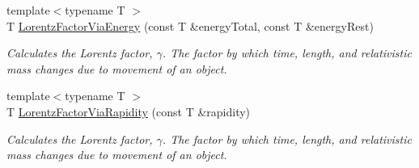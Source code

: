 \begin{DoxyCompactItemize}
{\footnotesize template$<$typename T $>$ }\\T \hyperlink{group___relativity_ga601de8c039be89a9abea22bc459436c9}{Lorentz\+Factor\+Via\+Energy} (const T \&energy\+Total, const T \&energy\+Rest)
\begin{DoxyCompactList}\small\item\em Calculates the Lorentz factor, $\gamma$. The factor by which time, length, and relativistic mass changes due to movement of an object. \end{DoxyCompactList}\item 
{\footnotesize template$<$typename T $>$ }\\T \hyperlink{group___relativity_ga8064f5bce1d2ca5f7bc39d95ba4d2dd9}{Lorentz\+Factor\+Via\+Rapidity} (const T \&rapidity)
\begin{DoxyCompactList}\small\item\em Calculates the Lorentz factor, $\gamma$. The factor by which time, length, and relativistic mass changes due to movement of an object. \end{DoxyCompactList}\end{DoxyCompactItemize}
